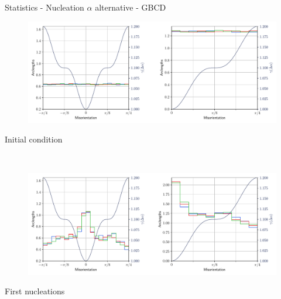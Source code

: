 \documentclass[usenames,dvipsnames]{beamer}
\begin{document}
\begin{frame}{Statistics - Nucleation $\alpha$ alternative - GBCD}
\small
    \begin{minipage}{\textwidth}
    \centering
    \vspace{-0.5em}
    \begin{figure}
    \centering
    \includegraphics[scale=0.33]{figures/stored_energy/SE/gbcd/000000_nuclalternative_set.pdf}
    \end{figure}
    \vspace{-2em}
    Initial condition
    \end{minipage}\\
    \begin{minipage}{\textwidth}
    \centering
    \begin{figure}
    \centering
    \includegraphics[scale=0.33]{figures/stored_energy/SE/gbcd/000070_nuclalternative_set.pdf}
    \end{figure}
    \vspace{-2em}
    First nucleations
    \end{minipage}
\end{frame}
\end{document}
